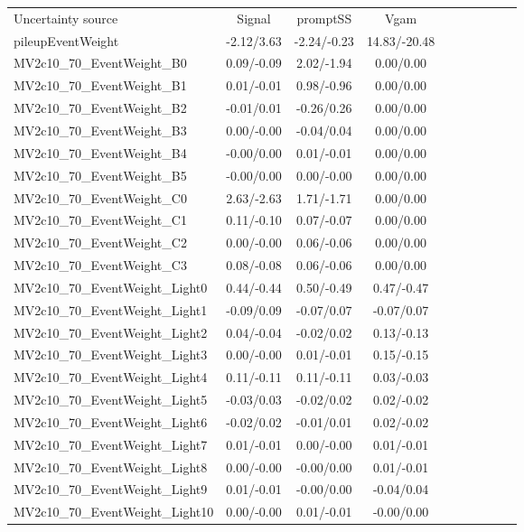 \begin{table}[h]
\scriptsize
\begin{center}
\begin{tabular}{l|ccccccccc}
\hline
\hline
Uncertainty source &Signal &promptSS &Vgam \\
pileupEventWeight &-2.12/3.63 &-2.24/-0.23 &14.83/-20.48 \\
MV2c10\_70\_EventWeight\_B0 &0.09/-0.09 &2.02/-1.94 &0.00/0.00 \\
MV2c10\_70\_EventWeight\_B1 &0.01/-0.01 &0.98/-0.96 &0.00/0.00 \\
MV2c10\_70\_EventWeight\_B2 &-0.01/0.01 &-0.26/0.26 &0.00/0.00 \\
MV2c10\_70\_EventWeight\_B3 &0.00/-0.00 &-0.04/0.04 &0.00/0.00 \\
MV2c10\_70\_EventWeight\_B4 &-0.00/0.00 &0.01/-0.01 &0.00/0.00 \\
MV2c10\_70\_EventWeight\_B5 &-0.00/0.00 &0.00/-0.00 &0.00/0.00 \\
MV2c10\_70\_EventWeight\_C0 &2.63/-2.63 &1.71/-1.71 &0.00/0.00 \\
MV2c10\_70\_EventWeight\_C1 &0.11/-0.10 &0.07/-0.07 &0.00/0.00 \\
MV2c10\_70\_EventWeight\_C2 &0.00/-0.00 &0.06/-0.06 &0.00/0.00 \\
MV2c10\_70\_EventWeight\_C3 &0.08/-0.08 &0.06/-0.06 &0.00/0.00 \\
MV2c10\_70\_EventWeight\_Light0 &0.44/-0.44 &0.50/-0.49 &0.47/-0.47 \\
MV2c10\_70\_EventWeight\_Light1 &-0.09/0.09 &-0.07/0.07 &-0.07/0.07 \\
MV2c10\_70\_EventWeight\_Light2 &0.04/-0.04 &-0.02/0.02 &0.13/-0.13 \\
MV2c10\_70\_EventWeight\_Light3 &0.00/-0.00 &0.01/-0.01 &0.15/-0.15 \\
MV2c10\_70\_EventWeight\_Light4 &0.11/-0.11 &0.11/-0.11 &0.03/-0.03 \\
MV2c10\_70\_EventWeight\_Light5 &-0.03/0.03 &-0.02/0.02 &0.02/-0.02 \\
MV2c10\_70\_EventWeight\_Light6 &-0.02/0.02 &-0.01/0.01 &0.02/-0.02 \\
MV2c10\_70\_EventWeight\_Light7 &0.01/-0.01 &0.00/-0.00 &0.01/-0.01 \\
MV2c10\_70\_EventWeight\_Light8 &0.00/-0.00 &-0.00/0.00 &0.01/-0.01 \\
MV2c10\_70\_EventWeight\_Light9 &0.01/-0.01 &-0.00/0.00 &-0.04/0.04 \\
MV2c10\_70\_EventWeight\_Light10 &0.00/-0.00 &0.01/-0.01 &-0.00/0.00 \\

\end{tabular}
\end{center}
\end{table}
